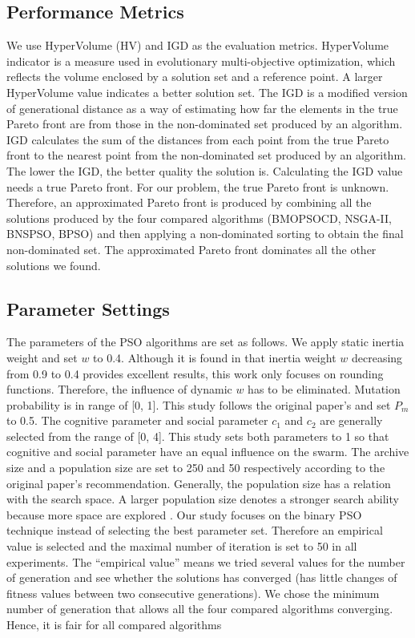 \documentclass[10pt,journal,compsoc]{IEEEtran}
\begin{document}
\subsection{Performance Metrics}
\label{sec:metrics}
We use HyperVolume (HV) and IGD as the evaluation metrics. HyperVolume indicator \cite{Zitzler1998, 7360024} is a measure used in evolutionary multi-objective optimization, which reflects the volume enclosed by a solution set and a reference point. A larger HyperVolume value indicates a better solution set. The IGD \cite{1501598} is a modified version of generational distance \cite{veldhuizen99} as a way of estimating how far the elements in the true Pareto front are from those in the non-dominated set produced by an algorithm. IGD calculates the sum of the distances from each point from the true Pareto front to the nearest point from the non-dominated set produced by an algorithm. The lower the IGD, the better quality the solution is. Calculating the IGD value needs a true Pareto front. For our problem, the true Pareto front is unknown. Therefore, an approximated Pareto front is produced by combining all the solutions produced by the four compared algorithms (BMOPSOCD, NSGA-II, BNSPSO, BPSO) and then applying a non-dominated sorting to obtain the final non-dominated set. The approximated Pareto front dominates all the other solutions we found.



\subsection{Parameter Settings}
\label{sec:parameters}
The parameters of the PSO algorithms are set as follows. We apply static inertia weight and set $w$ to 0.4. Although it is found in \cite{xin2009particle} that inertia weight $w$ decreasing from 0.9 to 0.4 provides excellent results, this work only focuses on rounding functions. Therefore, the influence of dynamic $w$ has to be eliminated. Mutation probability is in range of [0, 1]. This study follows the original paper's \cite{Raquel} and set $P_m$ to 0.5. The cognitive parameter and social parameter $c_1$ and $c_2$ are generally selected from the range of [0, 4]. This study sets both parameters to 1 \cite{Raquel} so that cognitive and social parameter have an equal influence on the swarm. The archive size and a population size are set to 250 and 50 respectively according to the original paper's \cite{Raquel} recommendation. Generally, the population size has a relation with the search space. A larger population size denotes a stronger search ability because 
more space are explored \cite{qi1994theoretical}.
Our study focuses on the binary PSO technique instead of selecting the best parameter set. Therefore an empirical value is selected and the maximal number of iteration is set to 50 in all experiments. 
The ``empirical value'' means we tried several values for the number of generation and see whether the solutions has converged (has little changes of fitness values between two consecutive generations). 
We chose the minimum number of generation that allows all the four compared algorithms converging. Hence, it is fair for all compared algorithms
\end{document}
